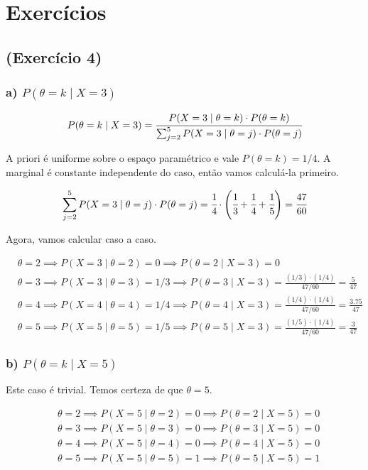 \section{Exercícios}

\subsection*{(Exercício 4)}

\subsubsection*{a) $P(\theta=k\;|\;X=3)$}

$$P(\theta=k\;|\;X=3) = \cfrac{P(X=3 \;|\; \theta=k) \cdot P(\theta=k)}{\sum_{j=2}^5 P(X=3 \;|\; \theta=j) \cdot P(\theta=j)}$$

A priori é uniforme sobre o espaço paramétrico e vale $P(\theta=k) = 1/4$. A marginal é constante independente do caso, então vamos calculá-la primeiro.

$$\sum_{j=2}^5 P(X=3 \;|\; \theta=j) \cdot P(\theta=j) = \cfrac{1}{4}\cdot\left(\cfrac{1}{3} +\cfrac{1}{4}+ \cfrac{1}{5} \right) = \cfrac{47}{60}$$

Agora, vamos calcular caso a caso.

\begin{align*}
    &\theta = 2 \implies P(X=3\;|\;\theta=2) = 0 \implies P(\theta=2\;|\;X=3) = 0\\
    &\theta = 3 \implies P(X=3\;|\;\theta=3) = 1/3 \implies P(\theta=3\;|\;X=3) = \frac{(1/3)\cdot (1/4)}{47/60} = \frac{5}{47}\\
    &\theta = 4 \implies P(X=4\;|\;\theta=4) = 1/4 \implies P(\theta=4\;|\;X=3) = \frac{(1/4)\cdot (1/4)}{47/60} = \frac{3.75}{47}\\
    &\theta = 5 \implies P(X=5\;|\;\theta=5) = 1/5 \implies P(\theta=5\;|\;X=3) = \frac{(1/5)\cdot (1/4)}{47/60} = \frac{3}{47}
\end{align*}

\subsubsection*{b) $P(\theta=k\;|\;X=5)$}

Este caso é trivial. Temos certeza de que $\theta = 5$.

\begin{align*}
    &\theta = 2 \implies P(X=5\;|\;\theta=2) = 0 \implies P(\theta=2\;|\;X=5) = 0\\
    &\theta = 3 \implies P(X=5\;|\;\theta=3) = 0 \implies P(\theta=3\;|\;X=5) = 0 \\
    &\theta = 4 \implies P(X=5\;|\;\theta=4) = 0 \implies P(\theta=4\;|\;X=5) = 0\\
    &\theta = 5 \implies P(X=5\;|\;\theta=5) = 1 \implies P(\theta=5\;|\;X=5) = 1\\ 
\end{align*}


